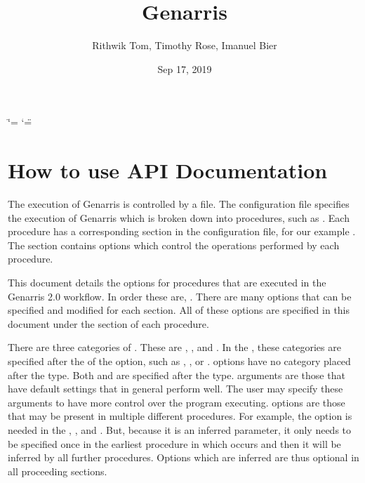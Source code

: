 \documentclass[letterpaper,10pt,english]{sphinxmanual}
\title{Genarris}
\date{Sep 17, 2019}
\author{Rithwik Tom, Timothy Rose, Imanuel Bier}
\begin{document}
\ifdefined\shorthandoff
  \ifnum\catcode`\=\string=\active\shorthandoff{=}\fi
  \ifnum\catcode`\"=\active{}\fi
\fi

\pagestyle{empty}
\sphinxmaketitle
\pagestyle{plain}
\sphinxtableofcontents
\pagestyle{normal}
\label{\detokenize{index::doc}}



\chapter{How to use API Documentation}
\label{\detokenize{index:how-to-use-api-documentation}}
The execution of Genarris is controlled by a  file. The configuration
file specifies the execution of Genarris which is broken down into procedures,
such as . Each procedure has a corresponding
section in the configuration file, for our example .
The section contains options which control the operations performed by each
procedure.

This document details the options for procedures that are executed in the Genarris 2.0
 workflow. In order these are, .
There are many options that can be specified and modified for each section.
All of these options are specified in this document under the
 section of each procedure.

There are three categories of . These are ,
, and . In the , these categories
are specified after the  of the option, such as , , or .
 options have no category placed after the type. Both  and
 are specified after the type.  arguments are those that
have default settings that in general perform well. The user may specify these
 arguments to have more control over the program executing.
 options are those that may be present in multiple different procedures.
For example, the option  is needed in the ,
, and . But, because it is
an inferred parameter, it only needs to be specified once in the earliest procedure
in which occurs and then it will be inferred by all further procedures. Options which
are inferred are thus optional in all proceeding sections.
\end{document}
